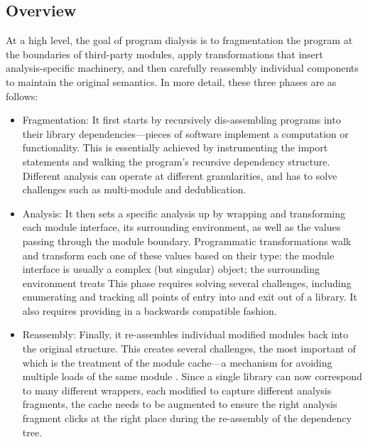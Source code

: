 \documentclass[letterpaper,twocolumn,10pt]{article}
\newcommand{\fra}{fragmentation\xspace} %
\newcommand{\ass}{reassembly\xspace}    %
\newcommand{\Fra}{Fragmentation\xspace} %
\newcommand{\Ana}{Analysis\xspace}      %
\newcommand{\Ass}{Reassembly\xspace}    %
\begin{document}
\subsection{Overview}
\label{overview}

At a high level, the goal of program dialysis is to \fra the program at the boundaries of third-party modules, apply transformations that insert analysis-specific machinery, and then carefully \ass individual components to maintain the original semantics.
 In more detail, these three phases are as follows:

\begin{itemize}
  
  \item \Fra:
    It first starts by recursively dis-assembling programs into their library dependencies---pieces of software implement a computation or functionality.
    This is essentially achieved by instrumenting the import statements and walking the program's recursive dependency structure.
    Different analysis can operate at different granularities, and has to solve challenges such as multi-module and dedublication.

  \item \Ana:
    It then sets a specific analysis up by wrapping and transforming each module interface, its surrounding environment, as well as the values passing through the module boundary.
    Programmatic transformations walk and transform each one of these values based on their type:
      the module interface is usually a complex (but singular) object; the surrounding environment treats 
    This phase requires solving several challenges, including enumerating and tracking all points of entry into and exit out of a library.
    It also requires providing 
     in a backwards compatible fashion.

  \item \Ass:
    Finally, it re-assembles individual modified modules back into the original structure.
    This creates several challenges, the most important of which is the treatment of the module cache---a mechanism for avoiding multiple loads of the same module .
    Since a single library can now correspond to many different wrappers, each modified to capture different  analysis fragments, the cache needs to be augmented to ensure the right analysis fragment clicks at the right place during the re-assembly of the dependency tree.

\end{itemize}
\end{document}
